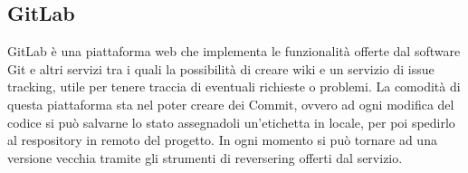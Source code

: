\subsection{GitLab}
GitLab \`e una piattaforma web che implementa le funzionalit\`a offerte dal software Git e altri
servizi tra i quali la possibilit\`a di creare wiki e un servizio di issue tracking, utile per tenere traccia
di eventuali richieste o problemi.
La comodit\`a di questa piattaforma sta nel poter creare dei Commit, ovvero ad ogni modifica del codice si pu\`o
salvarne lo stato assegnadoli un'etichetta in locale, per poi spedirlo al respository in remoto del progetto.
In ogni momento si pu\`o tornare ad una versione vecchia tramite gli strumenti di reversering offerti dal servizio.
